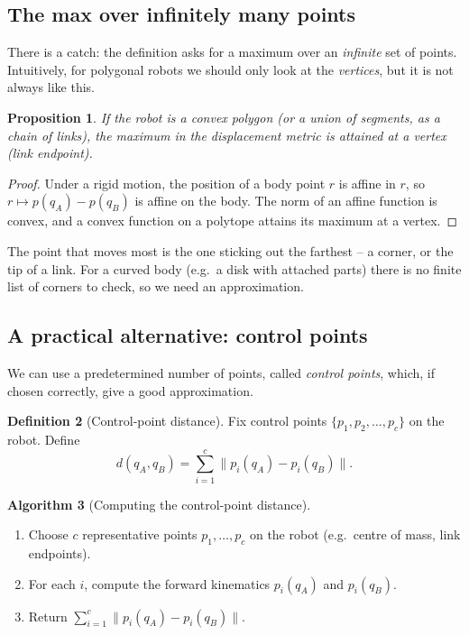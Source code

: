 \documentclass[11pt,a4paper]{article}
\newcommand{\norm}[1]{\lVert #1\rVert}
\theoremstyle{definition}
\newtheorem{definition}{Definition}[section]
\newtheorem{algorithm}[definition]{Algorithm}
\theoremstyle{plain}
\newtheorem{proposition}[definition]{Proposition}
\theoremstyle{remark}
\begin{document}
\subsection{The max over infinitely many points}

There is a catch: the definition asks for a maximum over an \emph{infinite} set of points. Intuitively, for polygonal robots we should only look at the \emph{vertices}, but it is not always like this.

\begin{proposition}
If the robot is a convex polygon (or a union of segments, as a chain of links), the maximum in the displacement metric is attained at a vertex (link endpoint).
\end{proposition}

\begin{proof}
Under a rigid motion, the position of a body point $r$ is affine in $r$, so $r\mapsto p(q_A)-p(q_B)$ is affine on the body. The norm of an affine function is convex, and a convex function on a polytope attains its maximum at a vertex.
\end{proof}

\begin{intuition}
The point that moves most is the one sticking out the farthest -- a corner, or the tip of a link. For a curved body (e.g.\ a disk with attached parts) there is no finite list of corners to check, so we need an approximation.
\end{intuition}

\subsection{A practical alternative: control points}

We can use a predetermined number of points, called \emph{control points}, which, if chosen correctly, give a good approximation.

\begin{definition}[Control-point distance]
Fix control points $\{p_1,p_2,\dots,p_c\}$ on the robot. Define
\[
  d(q_A,q_B)=\sum_{i=1}^{c}\norm{p_i(q_A)-p_i(q_B)} .
\]
\end{definition}

\begin{algorithm}[Computing the control-point distance]
\begin{enumerate}[nosep]
  \item Choose $c$ representative points $p_1,\dots,p_c$ on the robot (e.g.\ centre of mass, link endpoints).
  \item For each $i$, compute the forward kinematics $p_i(q_A)$ and $p_i(q_B)$.
  \item Return $\sum_{i=1}^c\norm{p_i(q_A)-p_i(q_B)}$.
\end{enumerate}
\end{algorithm}
\end{document}

